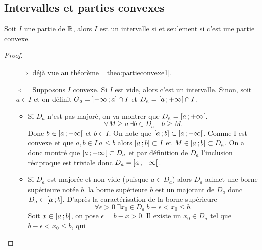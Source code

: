 \subsection{Intervalles et parties convexes}

\begin{theo}
  Soit \(I\) une partie de \(\mathbb{R}\), alors \(I\) est un intervalle si et seulement 
  si c'est une partie convexe.
\end{theo}
\begin{proof}
  \begin{itemize}
    \item[\(\implies\)] déjà vue au théorème~
      \ref{theo:partieconvexe1}.
    \item[\(\impliedby\)] Supposons \(I\) convexe. Si \(I\) est vide, alors 
      c'est un intervalle. Sinon, soit \(a\in I\) et on définit 
      \(G_a=\left] -\infty \, ;  a \right]\cap I\) et 
      \(D_a=\left[ a \, ;  +\infty \right[\cap I\).
      \begin{itemize}
        \item Si \(D_a\) n'est pas majoré, on va montrer que 
          \(D_a=\left[ a \, ;  +\infty \right[\).
          \begin{equation}
            \forall M \geqslant a \ \exists b \in D_a \quad b\geqslant M.
          \end{equation}
          Donc \(b\in \left[ a \, ;  +\infty \right[\) et \(b\in I\). On note que 
          \(\left[ a \, ;  b \right]\subset \left[ a \, ;  +\infty \right[\). Comme I est 
          convexe et que \(a,b \in I \ a \leqslant b\) alors 
          \(\left[ a \, ;  b \right]\subset I\) et \(M\in \left[ a \, ;  b \right] \subset 
          D_a\). On a donc montré que \(\left[ a \, ;  +\infty \right[ \subset D_a\) 
          et par définition de \(D_a\) l'inclusion réciproque est triviale donc 
          \(D_a=\left[ a \, ;  +\infty \right[\).
        \item Si \(D_a\) est majorée et non vide (puisque \(a\in D_a\)) alors 
          \(D_a\) admet une borne supérieure notée \(b\). la borne supérieure 
          \(b\) est un majorant de \(D_a\) donc \(D_a \subset 
          \left[ a \, ;  b \right]\). D'après la caractérisation de la borne 
          supérieure
          \begin{equation}
            \forall \epsilon >0 \ \exists x_0 \in D_a \ b-\epsilon < 
            x_0\leqslant b.
          \end{equation}
          Soit \(x\in \left[ a \, ;  b \right[\), on pose \(\epsilon=b-x>0\). Il 
          existe un \(x_0\in D_a\) tel que \(b-\epsilon<x_0 \leqslant b\), qui 

\end{itemize}
\end{itemize}
\end{proof}
